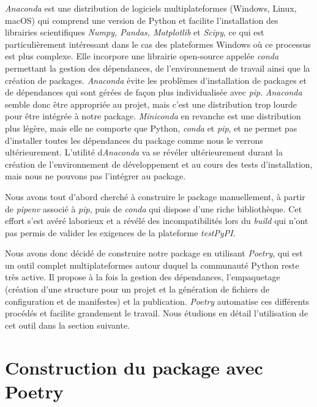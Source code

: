 \documentclass[twoside,a4paper,11pt,frenchb,openany]{report}
\begin{document}
\textit{Anaconda} est une distribution de logiciels multiplateformes (Windows, Linux, macOS) qui comprend une version de Python et facilite l'installation des librairies scientifiques \textit{Numpy, Pandas, Matplotlib} et \textit{Scipy}, ce qui est particulièrement intéressant dans le cas des plateformes Windows où ce processus est plus complexe. Elle incorpore une librairie open-source appelée \textit{conda} permettant la gestion des dépendances, de l'environnement de travail ainsi que la création de packages. \textit{Anaconda} évite les problèmes d'installation de packages et de dépendances qui sont gérées de façon plus individualisée avec \textit{pip}. \textit{Anaconda} semble donc être appropriée au projet, mais c'est une distribution trop lourde pour être intégrée à notre package. \textit{Miniconda} en revanche est une distribution plus légère, mais elle ne comporte que Python, \textit{conda} et \textit{pip}, et ne permet pas d'installer toutes les dépendances du package comme nous le verrons ultérieurement. L'utilité d\textit{Anaconda} va se révéler ultérieurement durant la création de l'environnement de développement et au cours des tests d'installation, mais nous ne pouvons pas l'intégrer au package.

Nous avons tout d'abord cherché à construire le package manuellement, à partir de \textit{pipenv} associé à \textit{pip}, puis de \textit{conda} qui dispose d'une riche bibliothèque. Cet effort s'est avéré laborieux et a révélé des incompatibilités lors du \textit{build} qui n'ont pas permis de valider les exigences de la plateforme \textit{testPyPI}.

Nous avons donc décidé de construire notre package en utilisant \textit{Poetry}, qui est un outil complet multiplateformes autour duquel la communauté Python reste très active. Il propose à la fois la gestion des dépendances, l'empaquetage (création d'une structure pour un projet et la génération de fichiers de configuration et de manifestes) et la publication. \textit{Poetry} automatise ces différents procédés et facilite grandement le travail. Nous étudions en détail l'utilisation de cet outil dans la section suivante.
	


\chapter{Construction du package avec Poetry}



\end{document}
